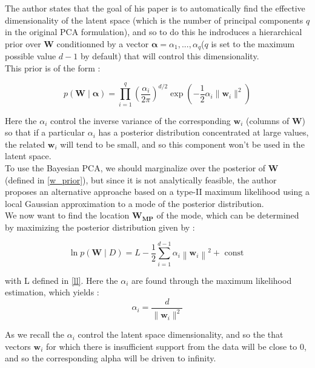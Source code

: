 \documentclass{article}
\begin{document}
The author states that the goal of his paper is to automatically find the effective dimensionality of the latent space (which is the number of principal components $q$ in the original PCA formulation), and so to do this he indroduces a hierarchical prior over $\mathbf{W}$ conditionned by a vector $\mathbf{\alpha} = {\alpha_1,...,\alpha_q}$($q$ is set to the maximum possible value $d-1$ by default) that will control this dimensionality.\\
This prior is of the form : 

\begin{equation}
    p(\mathbf{W} \mid \mathbf{\alpha}) = \prod_{i=1}^q (\frac{\alpha_i}{2 \pi})^{d/2} \exp(-\frac{1}{2} \alpha_i \| \mathbf{w}_i\|^2)
    \label{w_prior}
\end{equation}

Here the $\alpha_i$ control the inverse variance of the corresponding $\mathbf{w}_i$ (columns of $\mathbf{W}$) so that if a particular $\alpha_i$ has a posterior distribution concentrated at large values, the related $\mathbf{w}_i$  will tend to be small, and so this component won't be used in the latent space.\\


To use the Bayesian PCA, we should marginalize over the posterior of $\mathbf{W}$ (defined in \ref{w_prior}), but since it is not analytically feasible, the author proposes an alternative approache based on a type-II maximum likelihood using a local Gaussian approximation to a mode of the posterior distribution. \\
We now want to find the location $\mathbf{W_{\text{MP}}}$ of the mode, which can be determined by maximizing the posterior distribution given by :

\begin{equation}
    \ln p(\mathbf{W} \mid D)=L-\frac{1}{2} \sum_{i=1}^{d-1} \alpha_{i}\left\|\mathbf{w}_{i}\right\|^{2}+\text { const }
    \label{posterior}
\end{equation}

with L defined in \ref{ll}. Here the $\alpha_i$ are found through the maximum likelihood estimation, which yields : 
\begin{equation}
    \alpha_i = \frac{d}{\|\mathbf{w}_i\|^2}
    \label{alpha}
\end{equation}

As we recall the $\alpha_i$ control the latent space dimensionality, and so the that vectors $\mathbf{w}_i$ for which there is  insufficient support from the data will be close to 0, and so the corresponding alpha will be driven to infinity.\\
\end{document}
